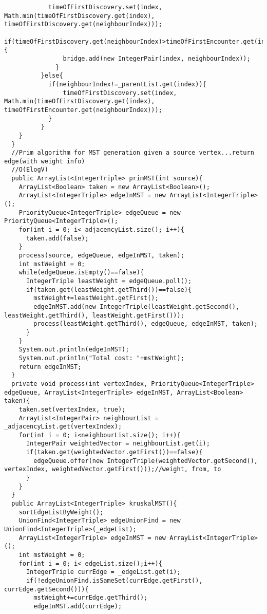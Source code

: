 \documentclass[11pt]{article}
\theoremstyle{definition}
\begin{document}
\begin{verbatim}
            timeOfFirstDiscovery.set(index, Math.min(timeOfFirstDiscovery.get(index), timeOfFirstDiscovery.get(neighbourIndex)));
            if(timeOfFirstDiscovery.get(neighbourIndex)>timeOfFirstEncounter.get(index)){
                bridge.add(new IntegerPair(index, neighbourIndex));
              }
          }else{
            if(neighbourIndex!=_parentList.get(index)){
                timeOfFirstDiscovery.set(index, Math.min(timeOfFirstDiscovery.get(index), timeOfFirstEncounter.get(neighbourIndex)));
            }
          }
    }
  }
  //Prim algorithm for MST generation given a source vertex...return edge(with weight info)
  //O(ElogV)
  public ArrayList<IntegerTriple> primMST(int source){
    ArrayList<Boolean> taken = new ArrayList<Boolean>();
    ArrayList<IntegerTriple> edgeInMST = new ArrayList<IntegerTriple>();
    PriorityQueue<IntegerTriple> edgeQueue = new PriorityQueue<IntegerTriple>();
    for(int i = 0; i<_adjacencyList.size(); i++){
      taken.add(false);
    }
    process(source, edgeQueue, edgeInMST, taken);
    int mstWeight = 0;
    while(edgeQueue.isEmpty()==false){
      IntegerTriple leastWeight = edgeQueue.poll();
      if(taken.get(leastWeight.getThird())==false){
        mstWeight+=leastWeight.getFirst();
        edgeInMST.add(new IntegerTriple(leastWeight.getSecond(), leastWeight.getThird(), leastWeight.getFirst()));
        process(leastWeight.getThird(), edgeQueue, edgeInMST, taken);
      }
    }
    System.out.println(edgeInMST);
    System.out.println("Total cost: "+mstWeight);
    return edgeInMST;
  }
  private void process(int vertexIndex, PriorityQueue<IntegerTriple> edgeQueue, ArrayList<IntegerTriple> edgeInMST, ArrayList<Boolean> taken){
    taken.set(vertexIndex, true);
    ArrayList<IntegerPair> neighbourList = _adjacencyList.get(vertexIndex);
    for(int i = 0; i<neighbourList.size(); i++){
      IntegerPair weightedVector = neighbourList.get(i);
      if(taken.get(weightedVector.getFirst())==false){
        edgeQueue.offer(new IntegerTriple(weightedVector.getSecond(), vertexIndex, weightedVector.getFirst()));//weight, from, to
      }
    }
  }
  public ArrayList<IntegerTriple> kruskalMST(){
    sortEdgeListByWeight();
    UnionFind<IntegerTriple> edgeUnionFind = new UnionFind<IntegerTriple>(_edgeList);
    ArrayList<IntegerTriple> edgeInMST = new ArrayList<IntegerTriple>();
    int mstWeight = 0;
    for(int i = 0; i<_edgeList.size();i++){
      IntegerTriple currEdge = _edgeList.get(i);
      if(!edgeUnionFind.isSameSet(currEdge.getFirst(), currEdge.getSecond())){
        mstWeight+=currEdge.getThird();
        edgeInMST.add(currEdge);

\end{verbatim}
\end{document}

